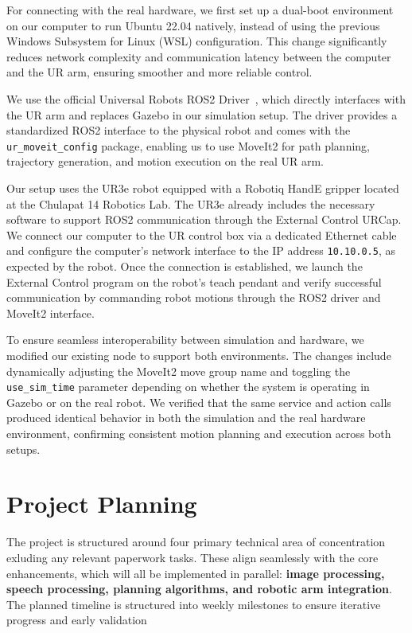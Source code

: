 \documentclass[12pt]{extarticle}
\begin{document}
For connecting with the real hardware, we first set up a dual-boot environment on our computer to run Ubuntu 22.04 natively, instead of using the previous Windows Subsystem for Linux (WSL) configuration. This change significantly reduces network complexity and communication latency between the computer and the UR arm, ensuring smoother and more reliable control.

We use the official Universal Robots ROS2 Driver~\cite{ur_ros2_driver}, which directly interfaces with the UR arm and replaces Gazebo in our simulation setup. The driver provides a standardized ROS2 interface to the physical robot and comes with the \texttt{ur\_moveit\_config} package, enabling us to use MoveIt2 for path planning, trajectory generation, and motion execution on the real UR arm.

Our setup uses the UR3e robot equipped with a Robotiq HandE gripper located at the Chulapat 14 Robotics Lab. The UR3e already includes the necessary software to support ROS2 communication through the External Control URCap. We connect our computer to the UR control box via a dedicated Ethernet cable and configure the computer’s network interface to the IP address \texttt{10.10.0.5}, as expected by the robot. Once the connection is established, we launch the External Control program on the robot’s teach pendant and verify successful communication by commanding robot motions through the ROS2 driver and MoveIt2 interface.

To ensure seamless interoperability between simulation and hardware, we modified our existing node to support both environments. The changes include dynamically adjusting the MoveIt2 move group name and toggling the \texttt{use\_sim\_time} parameter depending on whether the system is operating in Gazebo or on the real robot. We verified that the same service and action calls produced identical behavior in both the simulation and the real hardware environment, confirming consistent motion planning and execution across both setups.

\newpage
\section{Project Planning}
The project is structured around four primary technical area of concentration exluding any relevant paperwork tasks. These align seamlessly with the core enhancements, which will all be implemented in parallel: \textbf{image processing, speech processing, planning algorithms, and robotic arm integration}.  The planned timeline is structured into weekly milestones to ensure iterative progress and early validation 
\end{document}
